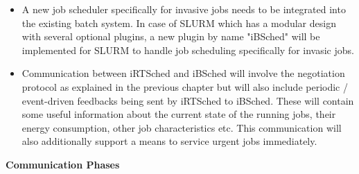 \begin{itemize}
\item A new job scheduler specifically for invasive jobs needs to be integrated into the existing batch system. In case of SLURM which has a modular design with several optional plugins, a new plugin by name "iBSched" will be implemented for SLURM to handle job scheduling specifically for invasic jobs.
\item Communication between iRTSched and iBSched will involve the negotiation protocol as explained in the previous chapter but will also include periodic / event-driven feedbacks being sent by iRTSched to iBSched. These will contain some useful information about the current state of the running jobs, their energy consumption, other job characteristics etc. This communication will also additionally support a means to service urgent jobs immediately.
\end{itemize}
\textbf{Communication Phases}
